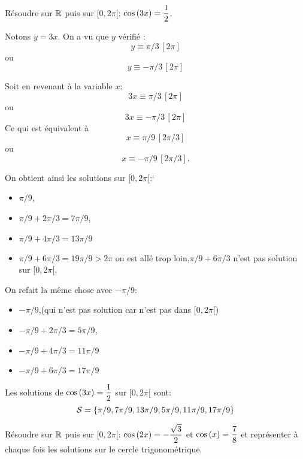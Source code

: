 \documentclass[a4paper, 11pt]{article}
\begin{document}
\begin{exemple}
R\'esoudre sur $\mathbb{R}$ puis sur $\lbrack 0,2\pi\lbrack$: $\cos{(3x)}=\displaystyle\frac{1}{2}$.
\end{exemple}
\begin{cor}
Notons $y= 3x$. On a vu que $y $  vérifié : 
$$y  \equiv \pi/3\,  [2\pi]$$
ou 
$$y  \equiv -\pi/3\,  [2\pi]$$

Soit  en revenant à la variable $x$: 
$$3x  \equiv \pi/3\,  [2\pi]$$
ou 
$$3x  \equiv -\pi/3\,  [2\pi]$$
Ce qui est équivalent à 
$$x  \equiv \pi/9\,  [2\pi/3]$$
ou 
$$x  \equiv -\pi/9\,  [2\pi/3].$$

On obtient ainsi les solutions sur $[0,2\pi[$:`
\begin{itemize}
\item $\pi/9$,
\item  $\pi/9+ 2\pi/3 =7\pi/9$,
\item  $\pi/9+ 4\pi/3 =13\pi/9$
\item  $\pi/9+ 6\pi/3 =19\pi/9>2\pi $ on est allé trop loin,$\pi/9+ 6\pi/3$ n'est pas solution sur $[0,2\pi[$.
\end{itemize}

On refait la même chose avec $-\pi/9$:
\begin{itemize}
\item $-\pi/9$,(qui n'est pas solution car n'est pas dans $[0,2\pi[$)
\item  $-\pi/9+ 2\pi/3 =5\pi/9$,
\item  $-\pi/9+ 4\pi/3 =11\pi/9$
\item  $-\pi/9+ 6\pi/3 =17\pi/9 $
\end{itemize}

Les solutions de  $\cos{(3x)}=\displaystyle\frac{1}{2}$ sur $[0,2\pi[$ sont:
$$\mathcal{S}=\{ \pi/9, 7\pi/9, 13\pi/9,5\pi/9, 11\pi/9,17\pi/9\}$$






\end{cor}



{\footnotesize
\begin{exo} R\'esoudre sur $\mathbb{R}$ puis sur $\lbrack 0,2\pi\lbrack$: $\displaystyle \cos{(2x)}=-\frac{\sqrt{3}}{2}$ et $\displaystyle \cos{(x)}=\frac{7}{8}$ et repr\'esenter \`{a} chaque fois les solutions sur le cercle trigonom\'etrique.
\end{exo}}
\end{document}

